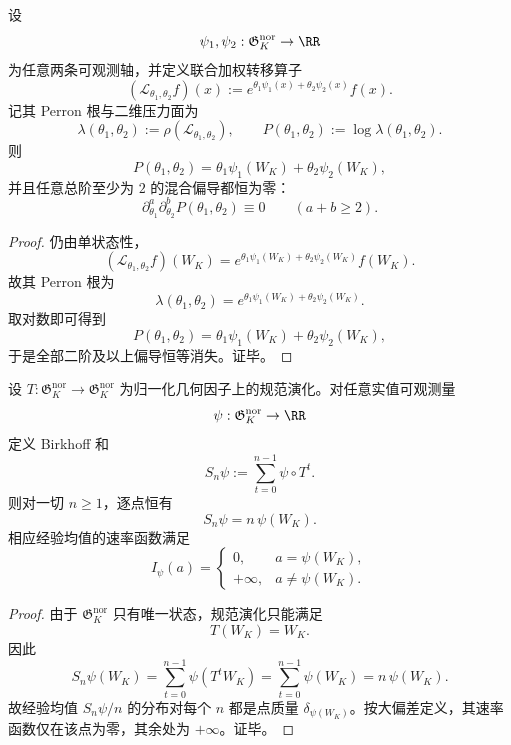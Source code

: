 \begin{theorem}[联合压力面的仿射退化]\label{thm:xi-time-part9xc-serrin-joint-pressure-affine-degeneration}
设
\[
\psi_1,\psi_2:\mathfrak G_{K}^{\mathrm{nor}}\to\RR
\]
为任意两条可观测轴，并定义联合加权转移算子
\[
(\mathcal L_{\theta_1,\theta_2}f)(x)
:=
e^{\theta_1\psi_1(x)+\theta_2\psi_2(x)}f(x).
\]
记其 Perron 根与二维压力面为
\[
\lambda(\theta_1,\theta_2):=\rho(\mathcal L_{\theta_1,\theta_2}),
\qquad
P(\theta_1,\theta_2):=\log\lambda(\theta_1,\theta_2).
\]
则
\[
P(\theta_1,\theta_2)
=
\theta_1\psi_1(W_K)+\theta_2\psi_2(W_K),
\]
并且任意总阶至少为 \(2\) 的混合偏导都恒为零：
\[
\partial_{\theta_1}^a\partial_{\theta_2}^bP(\theta_1,\theta_2)\equiv 0
\qquad (a+b\ge 2).
\]
\end{theorem}
\begin{proof}
仍由单状态性，
\[
(\mathcal L_{\theta_1,\theta_2}f)(W_K)
=
e^{\theta_1\psi_1(W_K)+\theta_2\psi_2(W_K)}f(W_K).
\]
故其 Perron 根为
\[
\lambda(\theta_1,\theta_2)=e^{\theta_1\psi_1(W_K)+\theta_2\psi_2(W_K)}.
\]
取对数即可得到
\[
P(\theta_1,\theta_2)=\theta_1\psi_1(W_K)+\theta_2\psi_2(W_K),
\]
于是全部二阶及以上偏导恒等消失。证毕。
\end{proof}

\begin{theorem}[大偏差退化与冻结线真空]\label{thm:xi-time-part9xc-serrin-ldp-vacuum}
设 \(T:\mathfrak G_K^{\mathrm{nor}}\to\mathfrak G_K^{\mathrm{nor}}\) 为归一化几何因子上的规范演化。对任意实值可观测量
\[
\psi:\mathfrak G_K^{\mathrm{nor}}\to\RR
\]
定义 Birkhoff 和
\[
S_n\psi:=\sum_{t=0}^{n-1}\psi\circ T^t.
\]
则对一切 \(n\ge 1\)，逐点恒有
\[
S_n\psi=n\,\psi(W_K).
\]
相应经验均值的速率函数满足
\[
I_\psi(a)=
\begin{cases}
0,& a=\psi(W_K),\\[2mm]
+\infty,& a\neq \psi(W_K).
\end{cases}
\]
\end{theorem}
\begin{proof}
由于 \(\mathfrak G_K^{\mathrm{nor}}\) 只有唯一状态，规范演化只能满足
\[
T(W_K)=W_K.
\]
因此
\[
S_n\psi(W_K)=\sum_{t=0}^{n-1}\psi(T^tW_K)=\sum_{t=0}^{n-1}\psi(W_K)=n\,\psi(W_K).
\]
故经验均值 \(S_n\psi/n\) 的分布对每个 \(n\) 都是点质量 \(\delta_{\psi(W_K)}\)。按大偏差定义，其速率函数仅在该点为零，其余处为 \(+\infty\)。证毕。
\end{proof}

